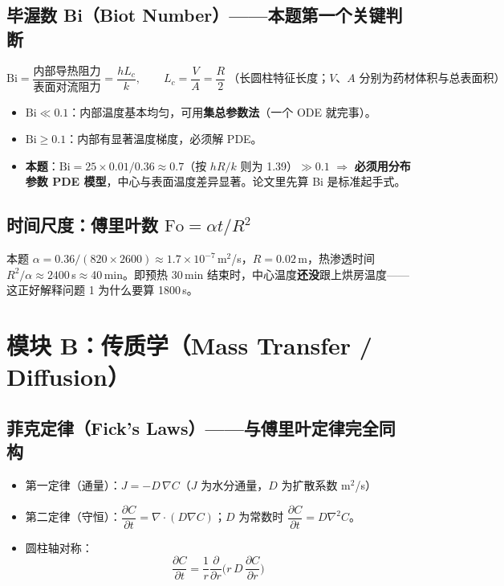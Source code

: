 \documentclass[12pt,a4paper]{ctexart}
\begin{document}
\subsection{毕渥数 Bi（Biot Number）——本题第一个关键判断}
\begin{equation}
\mathrm{Bi}=\frac{\text{内部导热阻力}}{\text{表面对流阻力}}=\frac{hL_c}{k},\qquad L_c=\frac{V}{A}=\frac{R}{2}\ \text{（长圆柱特征长度；}V、A\text{ 分别为药材体积与总表面积）}
\end{equation}
\begin{itemize}
\item $\mathrm{Bi}\ll 0.1$：内部温度基本均匀，可用\textbf{集总参数法}（一个 ODE 就完事）。
\item $\mathrm{Bi}\ge 0.1$：内部有显著温度梯度，必须解 PDE。
\item \textbf{本题}：$\mathrm{Bi}=25\times0.01/0.36\approx 0.7$（按 $hR/k$ 则为 1.39）$\gg 0.1$ $\Rightarrow$ \textbf{必须用分布参数 PDE 模型}，中心与表面温度差异显著。论文里先算 Bi 是标准起手式。
\end{itemize}

\subsection{时间尺度：傅里叶数 $\mathrm{Fo}=\alpha t/R^2$}
本题 $\alpha=0.36/(820\times2600)\approx1.7\times10^{-7}$\,m$^2$/s，$R=0.02$\,m，热渗透时间 $R^2/\alpha\approx2400$\,s$\approx$40\,min。即预热 30\,min 结束时，中心温度\textbf{还没}跟上烘房温度——这正好解释问题 1 为什么要算 1800\,s。

\section{模块 B：传质学（Mass Transfer / Diffusion）}

\subsection{菲克定律（Fick's Laws）——与傅里叶定律完全同构}
\begin{itemize}
\item 第一定律（通量）：$J=-D\,\nabla C$（$J$ 为水分通量，$D$ 为扩散系数 m$^2$/s）
\item 第二定律（守恒）：$\dfrac{\partial C}{\partial t}=\nabla\cdot(D\nabla C)$；$D$ 为常数时 $\dfrac{\partial C}{\partial t}=D\nabla^2 C$。
\item 圆柱轴对称：
\begin{equation}
\frac{\partial C}{\partial t}=\frac{1}{r}\frac{\partial}{\partial r}\Big(r\,D\,\frac{\partial C}{\partial r}\Big)
\end{equation}
\end{itemize}
\end{document}
